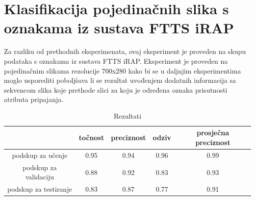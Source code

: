 \documentclass[times, utf8, diplomski, numeric]{fer}
\begin{document}
\section{Klasifikacija pojedinačnih slika s oznakama iz sustava FTTS iRAP}
Za razliku od prethodnih eksperimenata, ovaj eksperiment je proveden na skupu podataka s oznakama iz sustava FTTS iRAP.
Eksperiment je proveden na pojedinačnim slikama rezolucije $700$x$280$ kako bi se u daljnjim eksperimentima moglo usporediti poboljšava li se rezultat uvođenjem dodatnih informacija sa sekvencom slika koje prethode slici za koju je određena oznaka prisutnosti atributa pripajanja.

\begin{table}[H]
\centering
\caption{Rezultati}
\label{score:single_irap}
\begin{tabular}{c|c|c|c|c|}
\cline{2-5}
                                            & točnost & preciznost & odziv & prosječna preciznost \\ \hline
\multicolumn{1}{|c|}{podskup za učenje}     & 0.95       & 0.94        & 0.96     &           0.99           \\ \hline
\multicolumn{1}{|c|}{podskup za validaciju} & 0.88       & 0.92        & 0.83     &            0.93          \\ \hline
\multicolumn{1}{|c|}{podskup za testiranje} & 0.83       & 0.87        & 0.77     &            0.91          \\ \hline
\end{tabular}
\end{table}
\end{document}
